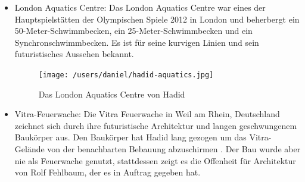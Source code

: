 \documentclass[a4paper, 12p]{article}
\begin{document}
\begin{itemize}
\item London Aquatics Centre: Das London Aquatics Centre war eines der
	Hauptspielstätten der Olympischen Spiele 2012 in London und beherbergt ein
	50-Meter-Schwimmbecken, ein 25-Meter-Schwimmbecken und ein
	Synchronschwimmbecken. Es ist für seine kurvigen Linien und sein
	futuristisches Aussehen bekannt.
\begin{figure}[h]
\centering
\texttt{[image: /users/daniel/hadid-aquatics.jpg]}
\caption{Das London Aquatics Centre von Hadid \cite{hadid_aquatics_centre}}

\end{figure}
\item Vitra-Feuerwache: Die Vitra Feuerwache in Weil am Rhein, Deutschland
	zeichnet sich durch ihre futuristische Architektur und langen geschwungenem
	Baukörper aus. Den Baukörper hat Hadid lang gezogen um das Vitra-Gelände von
	der benachbarten Bebauung abzuschirmen \cite[S. 26-29]{taschen_zaha_hadid}.
	Der Bau wurde aber nie als Feuerwache genutzt, stattdessen zeigt es die
	Offenheit für Architektur von Rolf Fehlbaum, der es in Auftrag gegeben hat.


\end{itemize}
\end{document}
